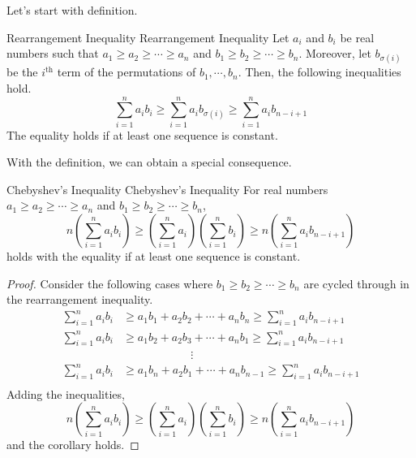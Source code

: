 \documentclass[../../main.tex]{subfiles}
\begin{document}
Let's start with definition.

\begin{definition}
{Rearrangement Inequality}
{Rearrangement Inequality}
Let $a_i$ and $b_i$ be real numbers such that $a_1 \geq a_2 \geq
\cdots \geq a_n$ and $b_1 \geq b_2 \geq \cdots \geq b_n$. Moreover,
let $b_{\sigma(i)}$ be the $i^\text{th}$ term of the permutations of
$b_1, \cdots, b_n$. Then, the following inequalities hold.
\[
\sum_{i=1}^n a_i b_i
\geq \sum_{i=1}^n a_i b_{\sigma(i)}
\geq \sum_{i=1}^n a_i b_{n-i+1}
\]
The equality holds if at least one sequence is constant.
\end{definition}

With the definition, we can obtain a special consequence.

\begin{corollary}
{Chebyshev's Inequality}
{Chebyshev's Inequality}
For real numbers $a_1 \geq a_2 \geq \cdots \geq a_n$ and $b_1 \geq b_2
\geq \cdots \geq b_n$,
\[
n \left( \sum_{i=1}^n a_i b_i \right)
\geq \left( \sum_{i=1}^n a_i \right)
\left( \sum_{i=1}^n b_i \right)
\geq n \left( \sum_{i=1}^n a_i b_{n-i+1} \right)
\]
holds with the equality if at least one sequence is constant.
\end{corollary}
\begin{proof}
Consider the following cases where $b_1 \geq b_2 \geq \cdots \geq b_n$
are cycled through in the rearrangement inequality.
\begin{align*}
    \sum_{i=1}^n a_i b_i
    &\geq a_1 b_1 + a_2 b_2 + \cdots + a_n b_n
    \geq \sum_{i=1}^n a_i b_{n-i+1} \\
    \sum_{i=1}^n a_i b_i
    &\geq a_1 b_2 + a_2 b_3 + \cdots + a_n b_1
    \geq \sum_{i=1}^n a_i b_{n-i+1} \\
    &\qquad\qquad\qquad \vdots \\
    \sum_{i=1}^n a_i b_i
    &\geq a_1 b_n + a_2 b_1 + \cdots + a_n b_{n-1}
    \geq \sum_{i=1}^n a_i b_{n-i+1} \\
\end{align*}
Adding the inequalities,
\[
n \left( \sum_{i=1}^n a_i b_i \right)
\geq \left( \sum_{i=1}^n a_i \right)
\left( \sum_{i=1}^n b_i \right)
\geq n \left( \sum_{i=1}^n a_i b_{n-i+1} \right)
\]
and the corollary holds.
\end{proof}
\end{document}
